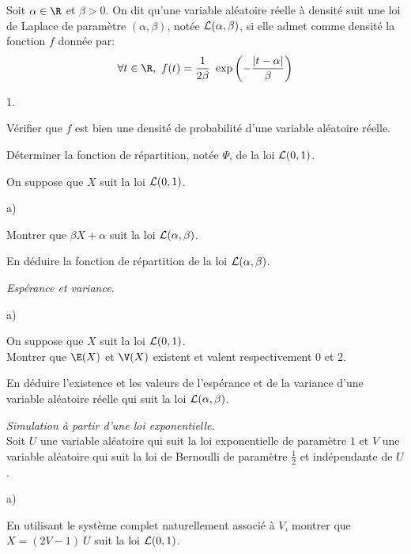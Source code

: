 \documentclass[11pt]{article}%
\begin{document}
\noindent 
Soit $\alpha\in\R$ et $\beta>0$. On dit qu'une variable aléatoire
réelle à densité suit une loi de Laplace de paramètre
$(\alpha,\beta)$, notée $\cal L(\alpha,\beta)$, si elle admet comme
densité la fonction $f$ donnée par:
\[
\forall t \in \R, \ f(t) = \dfrac{1}{2{\beta}} \ \exp\left(-
  \dfrac{|t-\alpha|}{\beta} \right)
\]
\begin{noliste}{1.}
  \setlength{\itemsep}{4mm}
\item Vérifier que $f$ est bien une densité de probabilité d'une
  variable aléatoire réelle.
  
  

\item Déterminer la fonction de répartition, notée $\Psi$, de la loi
  ${\cal L}(0,1)$.

  
  
\item On suppose que $X$ suit la loi ${\cal L} (0,1)$.
  
  \begin{noliste}{a)}
    \setlength{\itemsep}{2mm} %
  \item Montrer que $\beta X+\alpha$ suit la loi ${\cal
      L}(\alpha,\beta)$.

    
  
  
  
  
  
  
\item En déduire la fonction de répartition de la loi ${\cal
    L}(\alpha,\beta)$.
  
  
\end{noliste}

\item {\em Espérance et variance.}
  \begin{noliste}{a)}
  \setlength{\itemsep}{2mm} %
  \item On suppose que $X$ suit la loi ${\cal L}(0,1)$.\\
    Montrer que $\E(X)$ et $\V(X)$ existent et valent respectivement
    $0$ et $2$.

    

  \item En déduire l'existence et les valeurs de l'espérance et de la
    variance d'une variable aléatoire réelle qui suit la loi ${\cal
      L}(\alpha,\beta)$.

    
  \end{noliste}

\item {\em Simulation à partir d'une loi exponentielle.}\\
  Soit $U$ une variable aléatoire qui suit la loi exponentielle de
  paramètre $1$ et $V$ une variable aléatoire qui suit la loi de
  Bernoulli de paramètre $\frac{1}{2}$ et indépendante de $U$.
  \begin{noliste}{a)}
    \setlength{\itemsep}{2mm} %
  \item En utilisant le système complet naturellement associé à $V$,
    montrer que $X = (2V-1) \ U$ suit la loi ${\cal L}(0,1)$.


\end{noliste}
\end{noliste}
\end{document}
